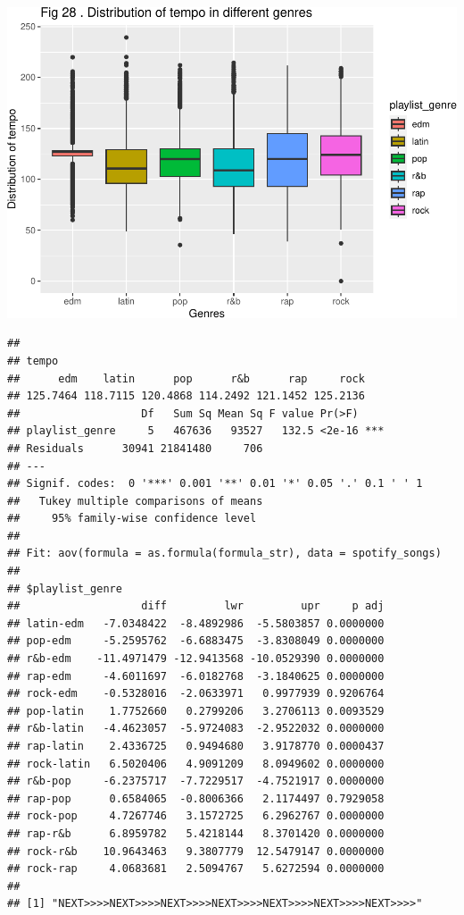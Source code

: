 \documentclass[
]{article}
\begin{document}
\includegraphics{Final-Report_files/figure-latex/unnamed-chunk-14-24.pdf}

\begin{verbatim}
## 
## tempo
##      edm    latin      pop      r&b      rap     rock 
## 125.7464 118.7115 120.4868 114.2492 121.1452 125.2136 
##                   Df   Sum Sq Mean Sq F value Pr(>F)    
## playlist_genre     5   467636   93527   132.5 <2e-16 ***
## Residuals      30941 21841480     706                   
## ---
## Signif. codes:  0 '***' 0.001 '**' 0.01 '*' 0.05 '.' 0.1 ' ' 1
##   Tukey multiple comparisons of means
##     95% family-wise confidence level
## 
## Fit: aov(formula = as.formula(formula_str), data = spotify_songs)
## 
## $playlist_genre
##                   diff         lwr         upr     p adj
## latin-edm   -7.0348422  -8.4892986  -5.5803857 0.0000000
## pop-edm     -5.2595762  -6.6883475  -3.8308049 0.0000000
## r&b-edm    -11.4971479 -12.9413568 -10.0529390 0.0000000
## rap-edm     -4.6011697  -6.0182768  -3.1840625 0.0000000
## rock-edm    -0.5328016  -2.0633971   0.9977939 0.9206764
## pop-latin    1.7752660   0.2799206   3.2706113 0.0093529
## r&b-latin   -4.4623057  -5.9724083  -2.9522032 0.0000000
## rap-latin    2.4336725   0.9494680   3.9178770 0.0000437
## rock-latin   6.5020406   4.9091209   8.0949602 0.0000000
## r&b-pop     -6.2375717  -7.7229517  -4.7521917 0.0000000
## rap-pop      0.6584065  -0.8006366   2.1174497 0.7929058
## rock-pop     4.7267746   3.1572725   6.2962767 0.0000000
## rap-r&b      6.8959782   5.4218144   8.3701420 0.0000000
## rock-r&b    10.9643463   9.3807779  12.5479147 0.0000000
## rock-rap     4.0683681   2.5094767   5.6272594 0.0000000
## 
## [1] "NEXT>>>>NEXT>>>>NEXT>>>>NEXT>>>>NEXT>>>>NEXT>>>>NEXT>>>>"
\end{verbatim}
\end{document}
